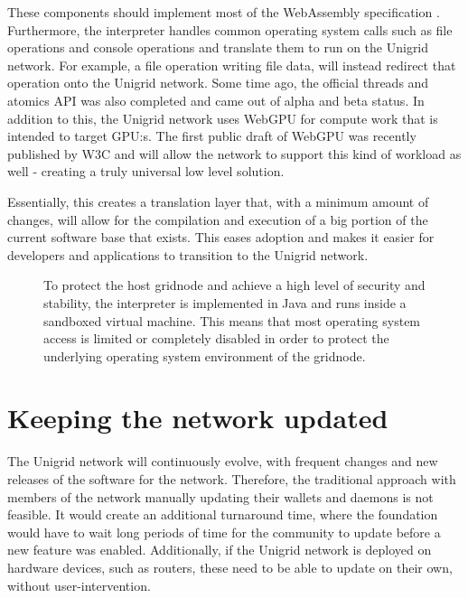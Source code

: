 \documentclass[10pt,a4paper,final]{article}
\begin{document}
These components should implement most of the WebAssembly specification \cite{webassembly}. Furthermore, the interpreter handles common operating system calls such as file operations and console operations and translate them to run on the Unigrid network. For example, a file operation writing file data, will instead redirect that operation onto the Unigrid network. Some time  ago, the official threads and atomics API \cite{webassemblythreads} was also completed and came out of alpha and beta status. In addition to this, the Unigrid network uses WebGPU for compute work that is intended to target GPU:s. The first public draft of WebGPU was recently published by W3C \cite{w3cwebgpu} and will allow the network to support this kind of workload as well - creating a truly universal low level solution.

Essentially, this creates a translation layer that, with a minimum amount of changes, will allow for the compilation and execution of a big portion of the current software base that exists. This eases adoption and makes it easier for developers and applications to transition to the Unigrid network.

\begin{figure}[H]
\centering
{}
\caption{To protect the host \gls{gridnode} and achieve a high level of security and stability, the interpreter is implemented in Java and runs inside a sandboxed virtual machine. This means that most operating system access is limited or completely disabled in order to protect the underlying operating system environment of the \gls{gridnode}.}
\end{figure}

\section{Keeping the network updated}
The Unigrid network will continuously evolve, with frequent changes and new releases of the software for the network. Therefore, the traditional approach with members of the network manually updating their wallets and daemons is not feasible. It would create an additional turnaround time, where the foundation would have to wait long periods of time for the community to update before a new feature was enabled. Additionally, if the Unigrid network is deployed on hardware devices, such as routers, these need to be able to update on their own, without user-intervention.
\end{document}
